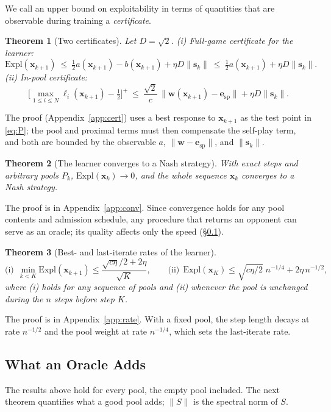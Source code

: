 \documentclass{article} %
\theoremstyle{plain}
\newtheorem{theorem}{Theorem}[section]
\theoremstyle{remark}
\newcommand{\Expl}{\mathrm{Expl}}
\newcommand{\bx}{{\bm{x}}}
\newcommand{\bw}{{\bm{w}}}
\newcommand{\be}{{\bm{e}}}
\newcommand{\dx}{{\bm{s}}}
\newcommand{\esp}{\be_{\mathrm{sp}}}
\begin{document}
We call an upper bound on exploitability in terms of quantities that are observable during training a \emph{certificate}.

\begin{theorem}[Two certificates]
\label{thm:cert}
Let $D=\sqrt2$. (i) Full-game certificate for the learner:
\[
\Expl(\bx_{k+1})\ \le\ \tfrac12a(\bx_{k+1})-b(\bx_{k+1})+\eta D\|\dx_k\|\ \le\ \tfrac12a(\bx_{k+1})+\eta D\|\dx_k\| .
\]
(ii) In-pool certificate:
\[
\Big[\max_{1\le i\le N}\ell_i(\bx_{k+1})-\tfrac12\Big]^+\ \le\ \frac{\sqrt2}{c}\,\|\bw(\bx_{k+1})-\esp\|+\eta D\|\dx_k\| .
\]
\end{theorem}
The proof (Appendix~\ref{app:cert}) uses a best response to $\bx_{k+1}$ as the test point in \eqref{eq:P}; the pool and proximal terms must then compensate the self-play term, and both are bounded by the observable $a$, $\|\bw-\esp\|$, and $\|\dx_k\|$.

\begin{theorem}[The learner converges to a Nash strategy]
\label{thm:conv}
With exact steps and arbitrary pools $P_k$, $\Expl(\bx_k)\to0$, and the whole sequence $\bx_k$ converges to a Nash strategy.
\end{theorem}
The proof is in Appendix~\ref{app:conv}. Since convergence holds for any pool contents and admission schedule, any procedure that returns an opponent can serve as an oracle; its quality affects only the speed (\S\ref{sec:oracle-rate}).

\begin{theorem}[Best- and last-iterate rates of the learner]
\label{thm:rate}
\[
\text{(i)}\ \ \min_{k<K}\Expl(\bx_{k+1})\le\frac{\sqrt{c\eta}/2+2\eta}{\sqrt K},\qquad
\text{(ii)}\ \ \Expl(\bx_K)\le\sqrt{c\eta/2}\;n^{-1/4}+2\eta\,n^{-1/2},
\]
where (i) holds for any sequence of pools and (ii) whenever the pool is unchanged during the $n$ steps before step $K$.
\end{theorem}
The proof is in Appendix~\ref{app:rate}. With a fixed pool, the step length decays at rate $n^{-1/2}$ and the pool weight at rate $n^{-1/4}$, which sets the last-iterate rate.

\subsection{What an Oracle Adds}
\label{sec:oracle-rate}

The results above hold for every pool, the empty pool included. The next theorem quantifies what a good pool adds; $\|S\|$ is the spectral norm of $S$.
\end{document}
